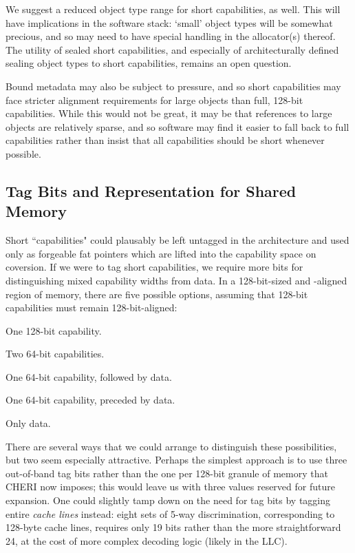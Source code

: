 We suggest a reduced object type range for short capabilities, as well.
This will have implications in the software stack: `small' object types
will be somewhat precious, and so may need to have special handling in the
allocator(s) thereof.  The utility of sealed short capabilities, and
especially of architecturally defined sealing object types to short
capabilities, remains an open question.

Bound metadata may also be subject to pressure, and so short capabilities
may face stricter alignment requirements for large objects than full,
128-bit capabilities.  While this would not be great, it may be that
references to large objects are relatively sparse, and so software may find
it easier to fall back to full capabilities rather than insist that all
capabilities should be short whenever possible.

\subsection{Tag Bits and Representation for Shared Memory} %

Short ``capabilities" could plausably be left untagged in the architecture
and used only as forgeable fat pointers which are lifted into the capability
space on coversion.
If we were to tag short capabilities, we require more bits for
distinguishing mixed capability widths from data.
In a 128-bit-sized and -aligned
region of memory, there are five possible options, assuming that 128-bit
capabilities must remain 128-bit-aligned:
%
\begin{inenum}
%
  \item One 128-bit capability.
%
  \item Two 64-bit capabilities.
%
  \item One 64-bit capability, followed by data.
%
  \item One 64-bit capability, preceded by data.
%
  \item Only data.
%
\end{inenum}
%
There are several ways that we could arrange to distinguish these
possibilities, but two seem especially attractive.  Perhaps the simplest
approach is to use three out-of-band tag bits rather than the one per
128-bit granule of memory that CHERI now imposes; this would leave us with
three values reserved for future expansion.  One could slightly tamp down on
the need for tag bits by tagging entire \emph{cache lines} instead: eight
sets of 5-way discrimination, corresponding to 128-byte cache lines, requires
only 19 bits rather than the more straightforward 24, at the cost of more
complex decoding logic (likely in the LLC).

